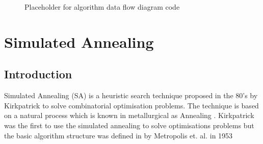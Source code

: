 \begin{figure}[htbp!]
	\centering
	\setlength \fboxsep{0pt}
	\setlength \fboxrule{0.5pt}
	\caption{Placeholder for algorithm data flow diagram code}
	\label{fig:TSFlowDiagram}
\end{figure}
\section{Simulated Annealing}
\subsection{Introduction}
Simulated Annealing (SA) is a heuristic search technique proposed in the 80's by Kirkpatrick to solve combinatorial optimisation problems. The technique is based on a natural process which is known in metallurgical as Annealing \cite{CurveFittingSA,SASingleMultiObj,TempCyclingSA,ChaosSA}. Kirkpatrick was the first to use the simulated annealing to solve optimisations problems but the basic algorithm structure was defined in by Metropolis et. al. in 1953 \cite{CurveFittingSA,VeryFastSAImageEnchancement}

